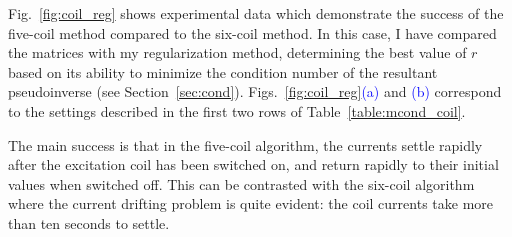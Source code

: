 
Fig.~\ref{fig:coil_reg} shows experimental data which demonstrate the
success of the five-coil method compared to the six-coil method.  In
this case, I have compared the matrices with my regularization method,
determining the best value of $r$ based on its ability to minimize the
condition number of the resultant pseudoinverse (see
Section~\ref{sec:cond}).  Figs.~\ref{fig:coil_reg}\textcolor{blue}{(a)} and \textcolor{blue}{(b)}
correspond to the settings described in the first two rows of
Table~\ref{table:mcond_coil}.

The main success is that in the five-coil algorithm, the currents
settle rapidly after the excitation coil has been switched on, and
return rapidly to their initial values when switched off.  This can be
contrasted with the six-coil algorithm where the current drifting
problem is quite evident: the coil currents take more than ten seconds
to settle.


